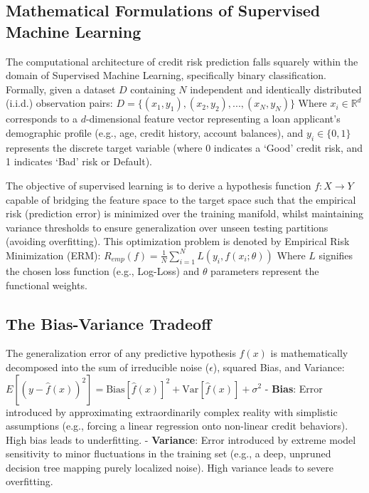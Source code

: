 \hypertarget{mathematical-formulations-of-supervised-machine-learning}{%
\subsection{Mathematical Formulations of Supervised Machine
Learning}\label{mathematical-formulations-of-supervised-machine-learning}}

The computational architecture of credit risk prediction falls squarely
within the domain of Supervised Machine Learning, specifically binary
classification. Formally, given a dataset \(D\) containing \(N\)
independent and identically distributed (i.i.d.) observation pairs:
\(D = \{(x_1, y_1), (x_2, y_2), ..., (x_N, y_N)\}\) Where
\(x_i \in \mathbb{R}^d\) corresponds to a \(d\)-dimensional feature
vector representing a loan applicant's demographic profile (e.g., age,
credit history, account balances), and \(y_i \in \{0, 1\}\) represents
the discrete target variable (where 0 indicates a `Good' credit risk,
and 1 indicates `Bad' risk or Default).

The objective of supervised learning is to derive a hypothesis function
\(f: X \rightarrow Y\) capable of bridging the feature space to the
target space such that the empirical risk (prediction error) is
minimized over the training manifold, whilst maintaining variance
thresholds to ensure generalization over unseen testing partitions
(avoiding overfitting). This optimization problem is denoted by
Empirical Risk Minimization (ERM):
\(R_{emp}(f) = \frac{1}{N} \sum_{i=1}^{N} L(y_i, f(x_i; \theta))\) Where
\(L\) signifies the chosen loss function (e.g., Log-Loss) and \(\theta\)
parameters represent the functional weights.

\hypertarget{the-bias-variance-tradeoff}{%
\subsection{The Bias-Variance
Tradeoff}\label{the-bias-variance-tradeoff}}

The generalization error of any predictive hypothesis \(f(x)\) is
mathematically decomposed into the sum of irreducible noise
(\(\epsilon\)), squared Bias, and Variance:
\(E[(y - \hat{f}(x))^2] = \text{Bias}[\hat{f}(x)]^2 + \text{Var}[\hat{f}(x)] + \sigma^2\)
- \textbf{Bias}: Error introduced by approximating extraordinarily
complex reality with simplistic assumptions (e.g., forcing a linear
regression onto non-linear credit behaviors). High bias leads to
underfitting. - \textbf{Variance}: Error introduced by extreme model
sensitivity to minor fluctuations in the training set (e.g., a deep,
unpruned decision tree mapping purely localized noise). High variance
leads to severe overfitting.

